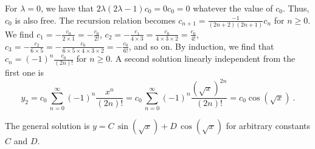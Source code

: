 \begin{egg}
For $\lambda = 0$, we have that
$\displaystyle 2\lambda( 2\lambda -1)c_0 = 0 c_0 = 0$ whatever the
value of $c_0$.  Thus, $c_0$ is also free.  The recursion relation becomes
$\displaystyle c_{n+1} = \frac{-1}{(2n+2)(2n+1)} c_n$
for $n \geq 0$.  We find
$\displaystyle c_1 = - \frac{c_0}{2\times 1} = - \frac{c_0}{2!}$,
$\displaystyle c_2 = - \frac{c_1}{4\times 3}
= \frac{c_0}{4 \times 3 \times 2} = \frac{c_0}{4!}$,
$\displaystyle c_3 = - \frac{c_2}{6\times 5}
= -\frac{c_0}{6\times 5\times 4 \times 3 \times 2} = - \frac{c_0}{6!}$,
and so on.  By induction, we find that
$\displaystyle c_n = (-1)^n \frac{c_0}{(2n)!}$ for $n\geq 0$.
A second solution linearly independent from the first one is
\[
y_2 = c_0 \, \sum_{n=0}^\infty (-1)^n \frac{x^n}{(2n)!}
= c_0 \, \sum_{n=0}^\infty (-1)^n \frac{(\sqrt{x})^{2n}}{(2n)!}
= c_0 \cos(\sqrt{x}) \ .
\]

The general solution is
$\displaystyle y = C\, \sin(\sqrt{x}) + D\, \cos(\sqrt{x})$ for
arbitrary constants $C$ and $D$.
\end{egg}

